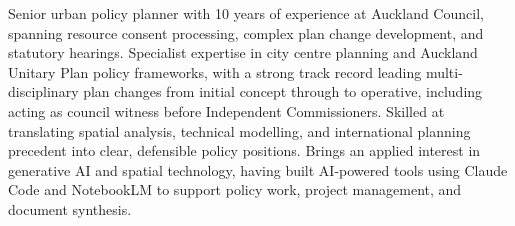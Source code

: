 \documentclass[11pt,a4paper,sans]{moderncv}
\begin{document}
\makecvtitle


\vspace{6pt}
\small{Senior urban policy planner with 10 years of experience at Auckland Council, spanning resource consent processing, complex plan change development, and statutory hearings. Specialist expertise in city centre planning and Auckland Unitary Plan policy frameworks, with a strong track record leading multi-disciplinary plan changes from initial concept through to operative, including acting as council witness before Independent Commissioners. Skilled at translating spatial analysis, technical modelling, and international planning precedent into clear, defensible policy positions. Brings an applied interest in generative AI and spatial technology, having built AI-powered tools using Claude Code and NotebookLM to support policy work, project management, and document synthesis.}

\end{document}
